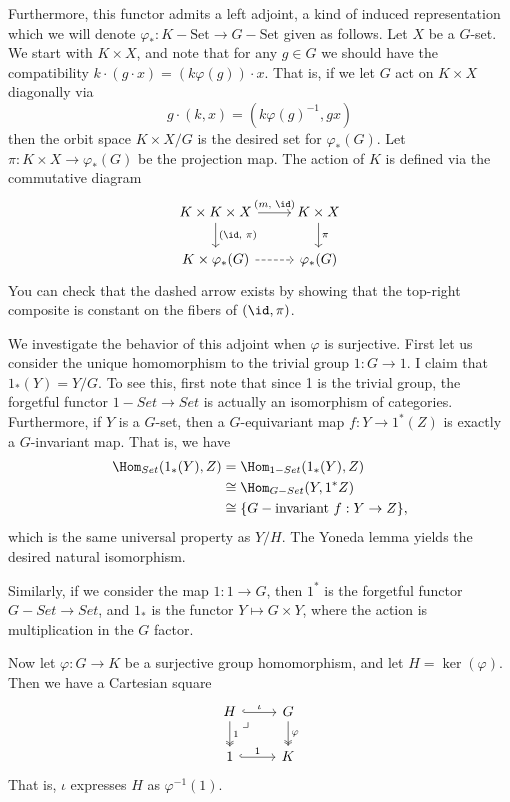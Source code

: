 \documentclass[12nt]{article}
\theoremstyle{plain}
\begin{document}
Furthermore, this functor admits a left adjoint, a kind of induced representation which we will denote $\varphi_* : K-\text{Set} \to G-\text{Set}$ given as follows. Let $X$ be a $G$-set. We start with $K \times X$, and note that for any $g \in G$ we should have the compatibility $k \cdot (g \cdot x) = (k\varphi(g)) \cdot x$. That is, if we let $G$ act on $K \times X$ diagonally via
\[
	g \cdot (k, x) = (k\varphi(g)^{-1}, gx)
\]
then the orbit space 
$K \times X/G$ is the desired set for $\varphi_*(G)$. Let $\pi : K \times X \to \varphi_*(G)$ be the projection map. The action of $K$ is defined via the commutative diagram
\[
	\begin{tikzcd}
		K \times K \times X \ar[r, "(m \text{, } \id)"] \ar[d, "(\id \text{, } \pi)"] & K \times X \ar[d, "\pi"]  \\
		K \times \varphi_*(G) \ar[r, dashed] & \varphi_*(G)
	\end{tikzcd}
\]
You can check that the dashed arrow exists by showing that the top-right composite is constant on the fibers of $(\id, \pi)$. 

We investigate the behavior of this adjoint when $\varphi$ is surjective. First let us consider the unique homomorphism to the trivial group $1 : G \to 1$. I claim that $1_*(Y) = Y/G$. To see this, first note that since 1 is the trivial group, the forgetful functor $1-Set \to Set$ is actually an isomorphism of categories.  Furthermore, if $Y$ is a $G$-set, then a $G$-equivariant map $f : Y \to 1^*(Z)$ is exactly a $G$-invariant map. That is, we have
\begin{align*}
	\Hom_{Set}(1_*(Y), Z) &= \Hom_{1-Set}(1_*(Y), Z)\\
	&\cong \Hom_{G-Set}(Y, 1^* Z) \\
	&\cong \{G-\text{invariant } f : Y \to Z\},
\end{align*}
which is the same universal property as $Y/H$. The Yoneda lemma yields the desired natural isomorphism. 

Similarly, if we consider the map $1 : 1 \to G$, then $1^*$ is the forgetful functor $G-Set \to Set$, and $1_*$ is the functor $Y \mapsto G \times Y$, where the action is multiplication in the $G$ factor. 

Now let $\varphi : G \to K$ be a surjective group homomorphism, and let $H = \ker(\varphi)$. Then we have a Cartesian square
\[
	\begin{tikzcd}
		H \ar[r, hookrightarrow, "\iota"] \ar[d, twoheadrightarrow, "1"] \ar[dr, phantom, very near start, "\lrcorner"] & G \ar[d, twoheadrightarrow, "\varphi"] \\
		1 \ar[r, hookrightarrow, "1"] & K
	\end{tikzcd}
\]
That is, $\iota$ expresses $H$ as $\varphi^{-1}(1)$. 
\end{document}
